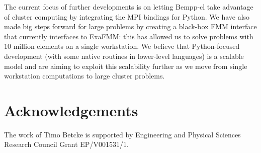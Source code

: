 The current focus of further developments is on letting Bempp-cl take advantage of cluster computing by integrating the  MPI bindings for Python. We have also made big steps forward for large problems by creating a black-box FMM interface that currently interfaces to ExaFMM: this has allowed us to solve problems with 10 million elements on a single workstation. We believe that Python-focused development (with some native routines in lower-level languages) is a scalable model and are aiming to exploit this scalability further as we move from single workstation computations to large cluster problems.

\section{Acknowledgements}
The work of Timo Betcke is supported by Engineering and Physical Sciences Research Council Grant EP/V001531/1.
